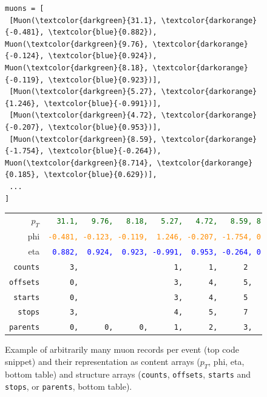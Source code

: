 \documentclass[a4paper]{jpconf}
\begin{document}
\begin{figure}
\begin{center}

\begin{minipage}{0.81\linewidth}
\scriptsize
\begin{Verbatim}[commandchars=\\\{\},frame=single]
muons = [
 [Muon(\textcolor{darkgreen}{31.1}, \textcolor{darkorange}{-0.481}, \textcolor{blue}{0.882}), Muon(\textcolor{darkgreen}{9.76}, \textcolor{darkorange}{-0.124}, \textcolor{blue}{0.924}), Muon(\textcolor{darkgreen}{8.18}, \textcolor{darkorange}{-0.119}, \textcolor{blue}{0.923})],
 [Muon(\textcolor{darkgreen}{5.27}, \textcolor{darkorange}{1.246}, \textcolor{blue}{-0.991})],
 [Muon(\textcolor{darkgreen}{4.72}, \textcolor{darkorange}{-0.207}, \textcolor{blue}{0.953})],
 [Muon(\textcolor{darkgreen}{8.59}, \textcolor{darkorange}{-1.754}, \textcolor{blue}{-0.264}), Muon(\textcolor{darkgreen}{8.714}, \textcolor{darkorange}{0.185}, \textcolor{blue}{0.629})],
 ...
]
\end{Verbatim}
\end{minipage}

\vspace{0.5 cm}
\renewcommand{\arraystretch}{1.25}
\begin{tabular}{| r | l |}
\hline
\small \mbox{\hspace{1 cm}$p_T$} & \textcolor{darkgreen}{\tt \ \ 31.1,\ \ \ 9.76,\ \ \ 8.18,\ \ \ 5.27,\ \ \ 4.72,\ \ \ 8.59, 8.714} \\
\small phi &  \small \textcolor{darkorange}{\tt -0.481,\ -0.123,\ -0.119,\ \ 1.246,\ -0.207,\ -1.754,\ 0.185} \\
\small eta &        \small \textcolor{blue}{\tt \ 0.882,\ \ 0.924,\ \ 0.923,\ -0.991,\ \ 0.953,\ -0.264,\ 0.629} \\\hline
\small {\tt counts}  & \small \tt \ \ \ \ \ 3,\ \ \ \ \ \ \ \ \ \ \ \ \ \ \ \ \ \ \ \ \ \ 1,\ \ \ \ \ \ 1,\ \ \ \ \ \ 2\ \ \ \ \ \ \ \ \ \\\hline
\small {\tt offsets} & \small \tt \ \ \ \ \ 0,\ \ \ \ \ \ \ \ \ \ \ \ \ \ \ \ \ \ \ \ \ \ 3,\ \ \ \ \ \ 4,\ \ \ \ \ \ 5,\ \ \ \ \ \ \ 7 \\\hline
\small {\tt starts}  & \small \tt \ \ \ \ \ 0,\ \ \ \ \ \ \ \ \ \ \ \ \ \ \ \ \ \ \ \ \ \ 3,\ \ \ \ \ \ 4,\ \ \ \ \ \ 5\ \ \ \ \ \ \ \ \ \\
\small {\tt stops}   & \small \tt \ \ \ \ \ 3,\ \ \ \ \ \ \ \ \ \ \ \ \ \ \ \ \ \ \ \ \ \ 4,\ \ \ \ \ \ 5,\ \ \ \ \ \ 7\ \ \ \ \ \ \ \ \ \\\hline
\small {\tt parents} & \small \tt \ \ \ \ \ 0,\ \ \ \ \ \ 0,\ \ \ \ \ \ 0,\ \ \ \ \ \ 1,\ \ \ \ \ \ 2,\ \ \ \ \ \ 3,\ \ \ \ \ 3 \\\hline
\end{tabular}

\end{center}

\caption{Example of arbitrarily many muon records per event (top code snippet) and their representation as content arrays ($p_T$, phi, eta, bottom table) and structure arrays ({\tt counts}, {\tt offsets}, {\tt starts} and {\tt stops}, or {\tt parents}, bottom table). \label{fig:muons}}
\end{figure}
\end{document}
